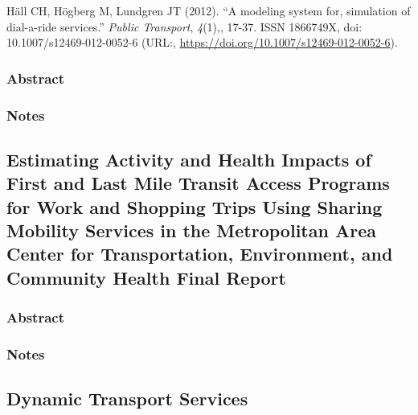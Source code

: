 \documentclass[]{article}
\begin{document}
Häll CH, Högberg M, Lundgren JT (2012). ``A modeling system for,
simulation of dial-a-ride services.'' \emph{Public Transport},
\emph{4}(1),, 17-37. ISSN 1866749X, doi: 10.1007/s12469-012-0052-6
(URL:, \url{https://doi.org/10.1007/s12469-012-0052-6}).

\hypertarget{abstract-21}{%
\subsubsection{Abstract}\label{abstract-21}}

\hypertarget{notes-21}{%
\subsubsection{Notes}\label{notes-21}}

\hypertarget{estimating-activity-and-health-impacts-of-first-and-last-mile-transit-access-programs-for-work-and-shopping-trips-using-sharing-mobility-services-in-the-metropolitan-area-center-for-transportation-environment-and-community-health-final-report}{%
\subsection{Estimating Activity and Health Impacts of First and Last
Mile Transit Access Programs for Work and Shopping Trips Using Sharing
Mobility Services in the Metropolitan Area Center for Transportation,
Environment, and Community Health Final
Report}\label{estimating-activity-and-health-impacts-of-first-and-last-mile-transit-access-programs-for-work-and-shopping-trips-using-sharing-mobility-services-in-the-metropolitan-area-center-for-transportation-environment-and-community-health-final-report}}

\hypertarget{abstract-22}{%
\subsubsection{Abstract}\label{abstract-22}}

\hypertarget{notes-22}{%
\subsubsection{Notes}\label{notes-22}}

\hypertarget{dynamic-transport-services}{%
\subsection{Dynamic Transport
Services}\label{dynamic-transport-services}}
\end{document}
